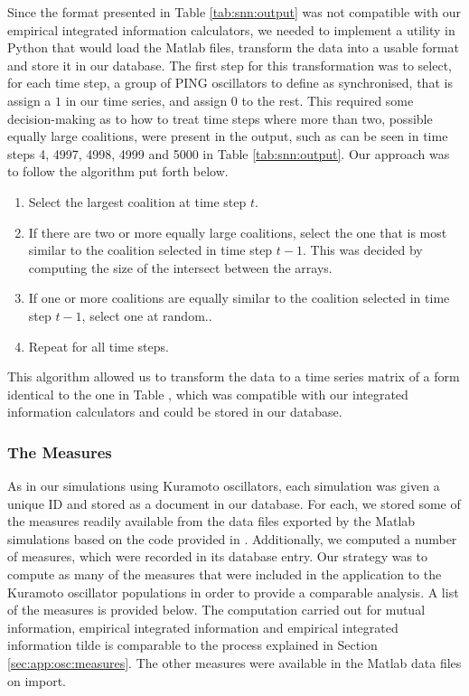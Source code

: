 \documentclass[a4paper,11pt]{article}
\begin{document}
Since the format presented in Table \ref{tab:snn:output} was not compatible with our empirical integrated information calculators, we needed to implement a utility in Python that would load the Matlab files, transform the data into a usable format and store it in our database. The first step for this transformation was to select, for each time step, a group of PING oscillators to define as synchronised, that is assign a $1$ in our time series, and assign $0$ to the rest. This required some decision-making as to how to treat time steps where more than two, possible equally large coalitions, were present in the output, such as can be seen in time steps 4, 4997, 4998, 4999 and 5000 in Table \ref{tab:snn:output}. Our approach was to follow the algorithm put forth below.

\begin{enumerate}
\item{Select the largest coalition at time step $t$.}
\item{If there are two or more equally large coalitions, select the one that is most similar to the coalition selected in time step $t - 1$. This was decided by computing the size of the intersect between the arrays.}
\item{If one or more coalitions are equally similar to the coalition selected in time step $t-1$, select one at random.}.
\item{Repeat for all time steps.}
\end{enumerate}

This algorithm allowed us to transform the data to a time series matrix of a form identical to the one in Table \label{tab:timeseries}, which was compatible with our integrated information calculators and could be stored in our database.

\subsubsection{The Measures}
\label{sec:app:snn:measures}

As in our simulations using Kuramoto oscillators, each simulation was given a unique ID and stored as a document in our database. For each, we stored some of the measures readily available from the data files exported by the Matlab simulations based on the code provided in \cite{Bhowmik2013}. Additionally, we computed a number of measures, which were recorded in its database entry. Our strategy was to compute as many of the measures that were included in the application to the Kuramoto oscillator populations in order to provide a comparable analysis. A list of the measures is provided below. The computation carried out for mutual information, empirical integrated information and empirical integrated information tilde is comparable to the process explained in Section \ref{sec:app:osc:measures}. The other measures were available in the Matlab data files on import.
\end{document}
